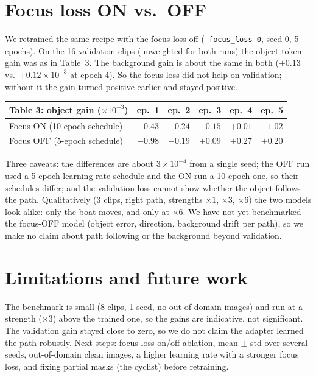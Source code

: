 \documentclass[9pt,a4paper]{extarticle}
\begin{document}
\section{Focus loss ON vs.\ OFF}
We retrained the same recipe with the focus loss off (\texttt{--focus\_loss 0}, seed 0, 5 epochs). On the 16 validation clips (unweighted for both runs) the object-token gain was as in Table~3. The background gain is about the same in both ($+0.13$ vs.\ $+0.12\times10^{-3}$ at epoch 4). So the focus loss did not help on validation; without it the gain turned positive earlier and stayed positive.
\begin{center}\small
\begin{tabular}{@{}lccccc@{}}
\toprule
Table 3: object gain ($\times10^{-3}$) & ep.\ 1 & ep.\ 2 & ep.\ 3 & ep.\ 4 & ep.\ 5\\
\midrule
Focus ON (10-epoch schedule) & $-0.43$ & $-0.24$ & $-0.15$ & $+0.01$ & $-1.02$\\
Focus OFF (5-epoch schedule) & $-0.98$ & $-0.19$ & $+0.09$ & $+0.27$ & $+0.20$\\
\bottomrule
\end{tabular}
\end{center}
Three caveats: the differences are about $3\times10^{-4}$ from a single seed; the OFF run used a 5-epoch learning-rate schedule and the ON run a 10-epoch one, so their schedules differ; and the validation loss cannot show whether the object follows the path. Qualitatively (3 clips, right path, strengths $\times1$, $\times3$, $\times6$) the two models look alike: only the boat moves, and only at $\times6$. We have not yet benchmarked the focus-OFF model (object error, direction, background drift per path), so we make no claim about path following or the background beyond validation.

\section{Limitations and future work}
The benchmark is small (8 clips, 1 seed, no out-of-domain images) and run at a strength ($\times3$) above the trained one, so the gains are indicative, not significant. The validation gain stayed close to zero, so we do not claim the adapter learned the path robustly. Next steps: focus-loss on/off ablation, mean $\pm$ std over several seeds, out-of-domain clean images, a higher learning rate with a stronger focus loss, and fixing partial masks (the cyclist) before retraining.
\end{document}
